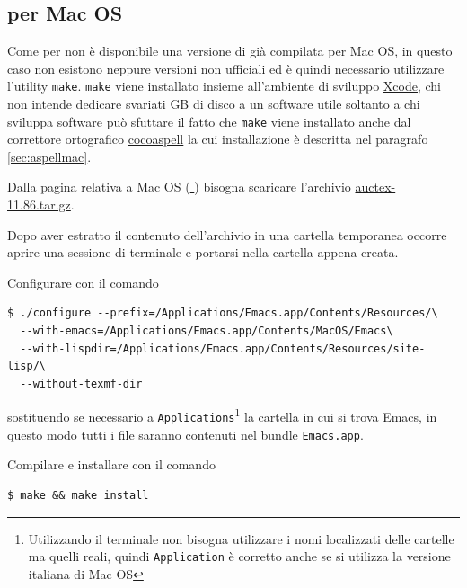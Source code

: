 \documentclass[10pt,a4paper]{article}
\begin{document}
\subsection*{\auctex{} per Mac OS}
\label{sec:auctexmac}

Come per \emacs{} non è disponibile una versione di \auctex{} già
compilata per Mac OS, in questo caso non esistono neppure versioni non
ufficiali ed è quindi necessario utilizzare l'utility \texttt{make}.
\texttt{make} viene installato insieme all'ambiente di sviluppo
\href{http://developer.apple.com/technologies/tools/whats-new.html}%
{Xcode}, chi non intende dedicare svariati GB di disco a un software
utile soltanto a chi sviluppa software può sfuttare il fatto che
\texttt{make} viene installato anche dal correttore ortografico
\href{http://cocoaspell.leuski.net/}{cocoaspell} la cui installazione
è descritta nel paragrafo \ref{sec:aspellmac}.

Dalla pagina relativa a Mac OS
(\href{http://www.gnu.org/software/auctex/download-for-macosx.html}%
{\mano{} \auctex}) bisogna scaricare l'archivio
\href{http://ftp.gnu.org/pub/gnu/auctex/auctex-11.86.tar.gz}%
{auctex-11.86.tar.gz}.

Dopo aver estratto il contenuto dell'archivio in una cartella
temporanea occorre aprire una sessione di terminale e portarsi nella
cartella appena creata.

Configurare \auctex{} con il comando
\begin{verbatim}
$ ./configure --prefix=/Applications/Emacs.app/Contents/Resources/\
  --with-emacs=/Applications/Emacs.app/Contents/MacOS/Emacs\
  --with-lispdir=/Applications/Emacs.app/Contents/Resources/site-lisp/\
  --without-texmf-dir
\end{verbatim}
sostituendo se necessario a \texttt{Applications}\footnote{Utilizzando
  il terminale non bisogna utilizzare i nomi localizzati delle
  cartelle ma quelli reali, quindi \texttt{Application} è corretto
  anche se si utilizza la versione italiana di Mac OS} la cartella in
cui si trova Emacs, in questo modo tutti i file saranno contenuti nel
bundle \texttt{Emacs.app}.

Compilare e installare con il comando
\begin{verbatim}
$ make && make install
\end{verbatim}
\end{document}
